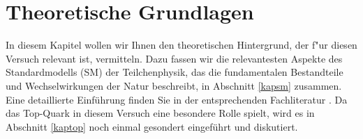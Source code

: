 \section{Theoretische Grundlagen}
\label{sm_chapter}
In diesem Kapitel wollen wir Ihnen den theoretischen Hintergrund, der f"ur diesen Versuch relevant ist, vermitteln. Dazu fassen wir die relevantesten Aspekte des Standardmodells (SM) der Teilchenphysik,
das die fundamentalen Bestandteile und Wechselwirkungen der Natur beschreibt, in Abschnitt \ref{kapsm} zusammen.
Eine detaillierte Einf\"uhrung finden Sie in der entsprechenden Fachliteratur \cite{Griffiths, Berger}. Da das Top-Quark in diesem Versuch eine besondere Rolle spielt,
wird es in Abschnitt \ref{kaptop} noch einmal gesondert eingef\"uhrt und diskutiert.

